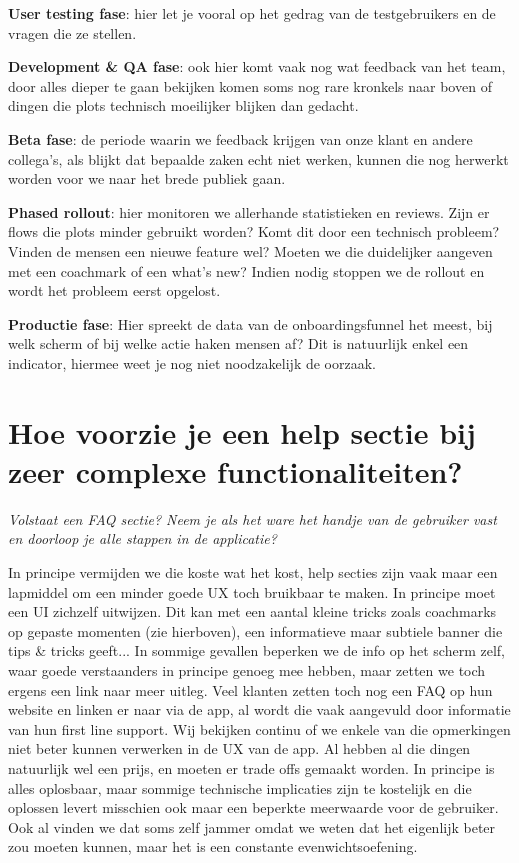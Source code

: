 \textbf{User testing fase}: hier let je vooral op het gedrag van de testgebruikers en de vragen die ze stellen.

\textbf{Development \& QA fase}: ook hier komt vaak nog wat feedback van het team, door alles dieper te gaan bekijken komen soms nog rare kronkels naar boven of dingen die plots technisch moeilijker blijken dan gedacht.

\textbf{Beta fase}: de periode waarin we feedback krijgen van onze klant en andere collega's, als blijkt dat bepaalde zaken echt niet werken, kunnen die nog herwerkt worden voor we naar het brede publiek gaan.

\textbf{Phased rollout}: hier monitoren we allerhande statistieken en reviews. Zijn er flows die plots minder gebruikt worden? Komt dit door een technisch probleem? Vinden de mensen een nieuwe feature wel? Moeten we die duidelijker aangeven met een coachmark of een what's new? Indien nodig stoppen we de rollout en wordt het probleem eerst opgelost.

\textbf{Productie fase}: Hier spreekt de data van de onboardingsfunnel het meest, bij welk scherm of bij welke actie haken mensen af? Dit is natuurlijk enkel een indicator, hiermee weet je nog niet noodzakelijk de oorzaak.

\section[Vraag 5]{Hoe voorzie je een help sectie bij zeer complexe functionaliteiten?}

\textit{Volstaat een FAQ sectie? Neem je als het ware het handje van de gebruiker vast en doorloop je alle stappen in de applicatie?}

In principe vermijden we die koste wat het kost, help secties zijn vaak maar een lapmiddel om een minder goede UX toch bruikbaar te maken. In principe moet een UI zichzelf uitwijzen. Dit kan met een aantal kleine tricks zoals coachmarks op gepaste momenten (zie hierboven), een informatieve maar subtiele banner die tips \& tricks geeft... In sommige gevallen beperken we de info op het scherm zelf, waar goede verstaanders in principe genoeg mee hebben, maar zetten we toch ergens een link naar meer uitleg. Veel klanten zetten toch nog een FAQ op hun website en linken er naar via de app, al wordt die vaak aangevuld door informatie van hun first line support. Wij bekijken continu of we enkele van die opmerkingen niet beter kunnen verwerken in de UX van de app. Al hebben al die dingen natuurlijk wel een prijs, en moeten er trade offs gemaakt worden. In principe is alles oplosbaar, maar sommige technische implicaties zijn te kostelijk en die oplossen levert misschien ook maar een beperkte meerwaarde voor de gebruiker. Ook al vinden we dat soms zelf jammer omdat we weten dat het eigenlijk beter zou moeten kunnen, maar het is een constante evenwichtsoefening.
